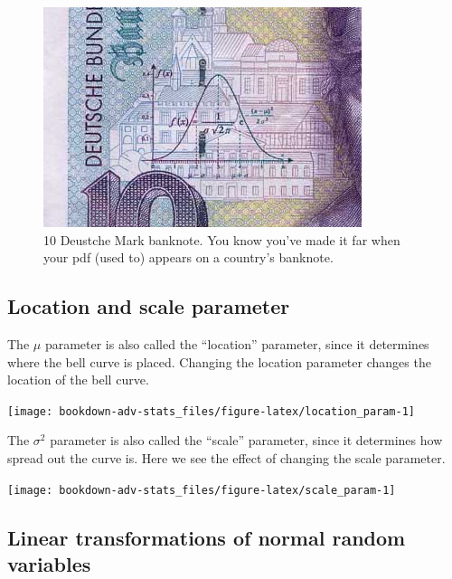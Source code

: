 \documentclass[
]{book}
\theoremstyle{definition}
\theoremstyle{definition}
\theoremstyle{definition}
\theoremstyle{definition}
\theoremstyle{remark}
\begin{document}
\begin{figure}

{\centering \includegraphics[width=0.6\linewidth]{figure/deutschemark} 

}

\caption{10 Deustche Mark banknote. You know you've made it far when your pdf (used to) appears on a country's banknote.}\label{fig:deutschemark}
\end{figure}

\hypertarget{location-and-scale-parameter}{%
\subsection{Location and scale parameter}\label{location-and-scale-parameter}}

The \(\mu\) parameter is also called the ``location'' parameter, since it determines where the bell curve is placed.
Changing the location parameter changes the location of the bell curve.

\begin{center}\texttt{[image: bookdown-adv-stats\_files/figure-latex/location\_param-1]} \end{center}

The \(\sigma^2\) parameter is also called the ``scale'' parameter, since it determines how spread out the curve is.
Here we see the effect of changing the scale parameter.

\begin{center}\texttt{[image: bookdown-adv-stats\_files/figure-latex/scale\_param-1]} \end{center}

\hypertarget{linear-transformations-of-normal-random-variables}{%
\subsection{Linear transformations of normal random variables}\label{linear-transformations-of-normal-random-variables}}
\end{document}
